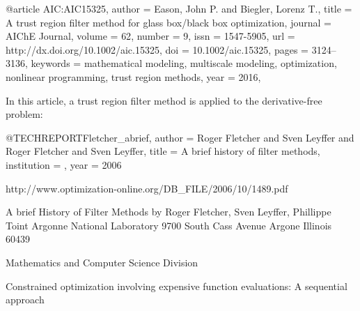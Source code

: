 @article {AIC:AIC15325,
author = {Eason, John P. and Biegler, Lorenz T.},
title = {A trust region filter method for glass box/black box optimization},
journal = {AIChE Journal},
volume = {62},
number = {9},
issn = {1547-5905},
url = {http://dx.doi.org/10.1002/aic.15325},
doi = {10.1002/aic.15325},
pages = {3124--3136},
keywords = {mathematical modeling, multiscale modeling, optimization, nonlinear programming, trust region methods},
year = {2016},
}


In this article, a trust region filter method is applied to the derivative-free problem:



@TECHREPORT{Fletcher_abrief,
    author = {Roger Fletcher and Sven Leyffer and Roger Fletcher and Sven Leyffer},
    title = {A brief history of filter methods},
    institution = {},
    year = {2006}
}

http://www.optimization-online.org/DB_FILE/2006/10/1489.pdf

A brief History of Filter Methods
by
Roger Fletcher, Sven Leyffer, Phillippe Toint
Argonne National Laboratory
9700 South Cass Avenue
Argone Illinois 60439


Mathematics and Computer Science Division

































Constrained optimization involving expensive function evaluations: A sequential approach

